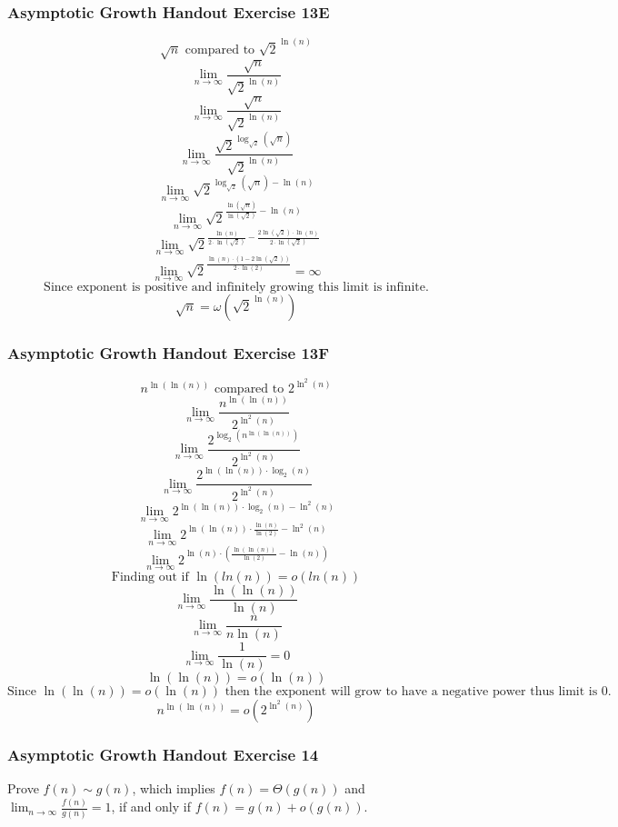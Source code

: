 \documentclass{article}
\begin{document}
\subsubsection{Asymptotic Growth Handout Exercise 13E}
$$\sqrt{n} \text{ compared to } \sqrt{2}^{\ln(n)}$$
$$\lim_{n \rightarrow \infty} \frac{\sqrt{n}}{\sqrt{2}^{\ln(n)}} $$
$$\lim_{n \rightarrow \infty} \frac{\sqrt{n}}{\sqrt{2}^{\ln(n)}} $$
$$\lim_{n \rightarrow \infty} \frac{\sqrt{2}^{\log_{\sqrt{2}}(\sqrt{n})}}{\sqrt{2}^{\ln(n)}} $$
$$\lim_{n \rightarrow \infty} \sqrt{2}^{\log_{\sqrt{2}}(\sqrt{n}) - \ln(n)} $$
$$\lim_{n \rightarrow \infty} \sqrt{2}^{\frac{\ln(\sqrt{n})}{\ln(\sqrt{2})} - \ln(n)} $$
$$\lim_{n \rightarrow \infty} \sqrt{2}^{\frac{\ln(n)}{2 \cdot \ln(\sqrt{2})} - \frac{2\ln(\sqrt{2}) \cdot \ln(n)}{2\cdot\ln(\sqrt{2})}} $$
$$\lim_{n \rightarrow \infty} \sqrt{2}^{\frac{\ln(n) \cdot (1 - 2 \ln(\sqrt{2}))}{2 \cdot \ln(2)}} = \infty$$
$$\text{Since exponent is positive and infinitely growing this limit is infinite.}$$
$$\sqrt{n} = \omega(\sqrt{2}^{\ln(n)})$$

\subsubsection{Asymptotic Growth Handout Exercise 13F}
$$n^{\ln(\ln(n))} \text{ compared to } 2^{\ln^2(n)}$$
$$\lim_{n \rightarrow \infty} \frac{n^{\ln(\ln(n))}}{2^{\ln^2(n)}} $$
$$\lim_{n \rightarrow \infty} \frac{2^{\log_{2}(n^{\ln(\ln(n))})}}{2^{\ln^2(n)}} $$
$$\lim_{n \rightarrow \infty} \frac{2^{\ln(\ln(n)) \cdot \log_{2}(n)}}{2^{\ln^2(n)}} $$
$$\lim_{n \rightarrow \infty} 2^{\ln(\ln(n)) \cdot \log_{2}(n) - \ln^2(n)} $$
$$\lim_{n \rightarrow \infty} 2^{\ln(\ln(n)) \cdot \frac{\ln(n)}{\ln(2)} - \ln^2(n)} $$
$$\lim_{n \rightarrow \infty} 2^{\ln(n) \cdot (\frac{\ln(\ln(n))}{\ln(2)} - \ln(n))} $$
$$\text{Finding out if } \ln(ln(n)) = o(ln(n))$$
$$\lim_{n \rightarrow \infty} \frac{\ln(\ln(n))}{\ln(n)} $$
$$\lim_{n \rightarrow \infty} \frac{n}{n \ln(n)} $$
$$\lim_{n \rightarrow \infty} \frac{1}{\ln(n)} = 0$$
$$\ln(\ln(n)) = o(\ln(n))$$
$$\text{Since } \ln(\ln(n)) = o(\ln(n)) \text{ then the exponent will grow to have a negative power thus limit is 0.}$$
$$n^{\ln(\ln(n))} = o(2^{\ln^2(n)})$$

\subsubsection{Asymptotic Growth Handout Exercise 14}
Prove $f(n) \sim g(n)$, which implies $f(n) = \Theta(g(n))$ and $\lim_{n \rightarrow \infty} \frac{f(n)}{g(n)} = 1$, if and only if $f(n) = g(n) + o(g(n))$.
\end{document}
